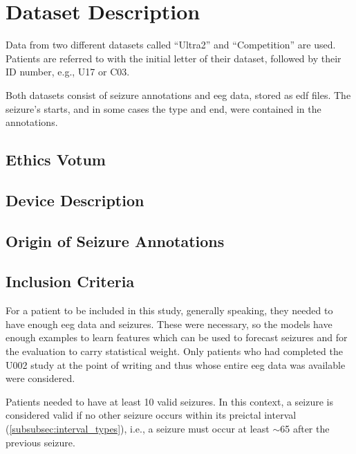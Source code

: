 \section{Dataset Description}\label{sec:dataset-description}
Data from two different datasets called ``Ultra2'' and ``Competition'' are used.
Patients are referred to with the initial letter of their dataset, followed by their ID number, e.g., U17 or C03.


Both datasets consist of seizure annotations and \gls{eeg} data, stored as \gls{edf} files.
The seizure's starts, and in some cases the type and end, were contained in the annotations.



\subsection{Ethics Votum}\label{subsec:ethics-votum}

\subsection{Device Description}\label{subsec:device-description}

\subsection{Origin of Seizure Annotations}\label{subsec:origin-of-seizure-annotations}

\subsection{Inclusion Criteria}\label{subsec:inclusion-criteria}
For a patient to be included in this study, generally speaking, they needed to have enough \gls{eeg} data and seizures.
These were necessary, so the models have enough examples to learn features which can be used to forecast seizures and for the evaluation to carry statistical weight.
Only patients who had completed the U002 study at the point of writing and thus whose entire \gls{eeg} data was available were considered. %

Patients needed to have at least 10 valid seizures.
In this context, a seizure is considered valid if no other seizure occurs within its preictal interval (\cref{subsubsec:interval_types}), i.e., a seizure must occur at least $\sim$\SI{65}{\min} after the previous seizure.

